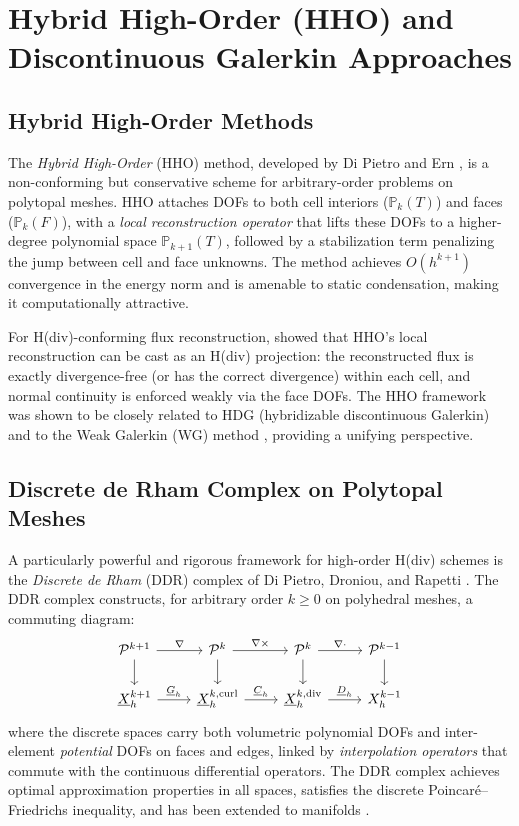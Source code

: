 \section{Hybrid High-Order (HHO) and Discontinuous Galerkin Approaches}

\subsection{Hybrid High-Order Methods}

The \emph{Hybrid High-Order} (HHO) method, developed by Di Pietro and Ern
\cite{dipietroHHO2015}, is a non-conforming but conservative scheme for
arbitrary-order problems on polytopal meshes. HHO attaches DOFs to both
cell interiors ($\mathbb{P}_k(T)$) and faces ($\mathbb{P}_k(F)$), with a
\emph{local reconstruction operator} that lifts these DOFs to a higher-degree
polynomial space $\mathbb{P}_{k+1}(T)$, followed by a stabilization term
penalizing the jump between cell and face unknowns. The method achieves
$O(h^{k+1})$ convergence in the energy norm and is amenable to static
condensation, making it computationally attractive.

For H(div)-conforming flux reconstruction, \cite{dipietroHHOdiv2017} showed
that HHO's local reconstruction can be cast as an H(div) projection: the
reconstructed flux is exactly divergence-free (or has the correct divergence)
within each cell, and normal continuity is enforced weakly via the face DOFs.
The HHO framework was shown to be closely related to HDG (hybridizable
discontinuous Galerkin) and to the Weak Galerkin (WG) method
\cite{dipietroBridge2016}, providing a unifying perspective.

\subsection{Discrete de Rham Complex on Polytopal Meshes}

A particularly powerful and rigorous framework for high-order H(div) schemes
is the \emph{Discrete de Rham} (DDR) complex of Di Pietro, Droniou, and
Rapetti \cite{dipietroDDR2021}. The DDR complex constructs, for arbitrary
order $k \geq 0$ on polyhedral meshes, a commuting diagram:
\[
\begin{tikzcd}
  \mathcal{P}^{k+1} \arrow[r,"\nabla"] \arrow[d] &
  \mathcal{P}^k \arrow[r,"\nabla\times"] \arrow[d] &
  \mathcal{P}^k \arrow[r,"\nabla\cdot"] \arrow[d] &
  \mathcal{P}^{k-1} \arrow[d] \\
  \underline{X}^{k+1}_h \arrow[r,"\underline{G}_h"] &
  \underline{X}^{k,\mathrm{curl}}_h \arrow[r,"\underline{C}_h"] &
  \underline{X}^{k,\mathrm{div}}_h \arrow[r,"\underline{D}_h"] &
  X^{k-1}_h
\end{tikzcd}
\]
where the discrete spaces carry both volumetric polynomial DOFs and
inter-element \emph{potential} DOFs on faces and edges, linked by
\emph{interpolation operators} that commute with the continuous differential
operators. The DDR complex achieves optimal approximation properties in
all spaces, satisfies the discrete Poincar\'{e}--Friedrichs inequality,
and has been extended to manifolds \cite{dipietroManifold2024}.

